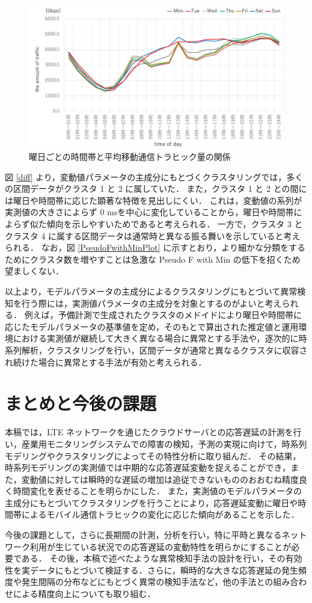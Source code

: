\documentclass[technicalreport]{ieicej}
\begin{document}
\begin{figure}[tb]
\centering
\includegraphics[height=0.55\hsize,width = \hsize]{./figure/traffic.pdf}
\caption{曜日ごとの時間帯と平均移動通信トラヒック量の関係}
\label{traffic}
\end{figure}

図 \ref{diff} より，変動値パラメータの主成分にもとづくクラスタリングでは，多くの区間データがクラスタ 1 と 2 に属していた．
また，クラスタ 1 と 2 との間には曜日や時間帯に応じた顕著な特徴を見出しにくい．
これは，変動値の系列が実測値の大きさによらず 0 msを中心に変化していることから，曜日や時間帯によらず似た傾向を示しやすいためであると考えられる．
一方で，クラスタ 3 とクラスタ 4 に属する区間データは通常時と異なる振る舞いを示していると考えられる．
なお，図 \ref{PseudoFwithMinPlot} に示すとおり，より細かな分類をするためにクラスタ数を増やすことは急激な Pseudo F with Min の低下を招くため望ましくない．

以上より，モデルパラメータの主成分によるクラスタリングにもとづいて異常検知を行う際には，実測値パラメータの主成分を対象とするのがよいと考えられる．
例えば，予備計測で生成されたクラスタのメドイドにより曜日や時間帯に応じたモデルパラメータの基準値を定め，そのもとで算出された推定値と運用環境における実測値が継続して大きく異なる場合に異常とする手法や，逐次的に時系列解析，クラスタリングを行い，区間データが通常と異なるクラスタに収容され続けた場合に異常とする手法が有効と考えられる．
\section{まとめと今後の課題}
本稿では，LTE ネットワークを通じたクラウドサーバとの応答遅延の計測を行い，産業用モニタリングシステムでの障害の検知，予測の実現に向けて，時系列モデリングやクラスタリングによってその特性分析に取り組んだ．
その結果，時系列モデリングの実測値では中期的な応答遅延変動を捉えることができ，また，変動値に対しては瞬時的な遅延の増加は追従できないもののおおむね精度良く時間変化を表せることを明らかにした．
また，実測値のモデルパラメータの主成分にもとづいてクラスタリングを行うことにより，応答遅延変動に曜日や時間帯によるモバイル通信トラヒックの変化に応じた傾向があることを示した．

今後の課題として，さらに長期間の計測，分析を行い，特に平時と異なるネットワーク利用が生じている状況での応答遅延の変動特性を明らかにすることが必要である．
その後，本稿で述べたような異常検知手法の設計を行い，その有効性を実データにもとづいて検証する．さらに，瞬時的な大きな応答遅延の発生頻度や発生間隔の分布などにもとづく異常の検知手法など，他の手法との組み合わせによる精度向上についても取り組む．



\end{document}
